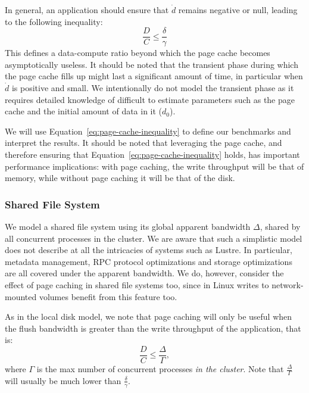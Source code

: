 \documentclass{IEEEtran}
\begin{document}
In general, an application should ensure that $\dot d$ remains negative 
or null, leading to the following inequality:
\begin{equation}
\frac{D}{C} \leq \frac{\delta}{\gamma} \label{eq:page-cache-inequality}
\end{equation}
This defines a data-compute ratio beyond which the page cache becomes 
asymptotically useless. It should be noted that the transient phase 
during which the page cache fills up might last a significant amount of time, 
in particular when $\dot d$ is positive and small. We intentionally do not model the 
transient phase as it requires detailed knowledge of difficult to estimate parameters  
such as the page cache and the initial amount 
of data in it ($d_0$).

 We will use Equation~\ref{eq:page-cache-inequality} to 
define our benchmarks and interpret the results. It 
should be noted that leveraging the page cache, and therefore ensuring 
that Equation~\ref{eq:page-cache-inequality} holds, has important 
performance implications: with page caching, the write throughput will 
be that of memory, while without page caching it will be that of the 
disk.


\subsubsection{Shared File System}

We model a shared file system using its global apparent bandwidth 
$\Delta$, shared by all concurrent processes in the cluster. We are 
aware that such a simplistic model does not describe at all the 
intricacies of systems such as Lustre. In particular, metadata 
management, RPC protocol optimizations and storage optimizations are 
all covered under the apparent bandwidth. We do, however, consider the 
effect of page caching in shared file systems too, since in Linux 
writes to network-mounted volumes benefit from this feature too.

As in the local disk model, we note that page caching will only be 
useful when the flush bandwidth is greater than the write throughput of 
the application, that is:
\begin{equation}
\frac{D}{C} \leq \frac{\Delta}{\Gamma}, \label{eq:page-cache-sharedfs}
\end{equation}
where $\Gamma$ is the max number of concurrent processes \emph{in the cluster}. 
Note that $\frac{\Delta}{\Gamma}$ will usually be much lower than 
$\frac{\delta}{\gamma}$.     
\end{document}
